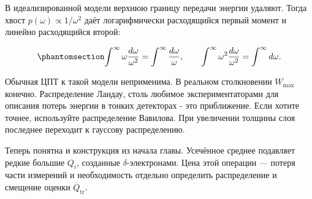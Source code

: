 \documentclass[
  russian,
  11pt,
  a4paper,
  open=any]{scrbook}
\begin{document}
В идеализированной модели верхнюю границу передачи энергии удаляют.
Тогда хвост \(p(\omega)\propto1/\omega^2\) даёт логарифмически
расходящийся первый момент и линейно расходящийся второй:

\begin{equation}\protect\phantomsection\label{eq-ch5-energy-transfer-divergent-moments}{
\int^\infty \omega\frac{d\omega}{\omega^2}
=\int^\infty\frac{d\omega}{\omega},
\qquad
\int^\infty \omega^2\frac{d\omega}{\omega^2}
=\int^\infty d\omega.
}\end{equation}

Обычная ЦПТ к такой модели неприменима. В реальном столкновении
\(W_{\max}\) конечно. Распределение Ландау, столь любимое
экспериментаторами для описания потерь энергии в тонких детекторах - это
приближение. Если хотите точнее, используйте распределение Вавилова. При
увеличении толщины слоя последнее переходит к гауссову распределению.

Теперь понятна и конструкция из начала главы. Усечённое среднее
подавляет редкие большие \(Q_i\), созданные \(\delta\)-электронами. Цена
этой операции --- потеря части измерений и необходимость отдельно
определить распределение и смещение оценки
\(\overline Q_{\mathrm{tr}}\).
\end{document}
